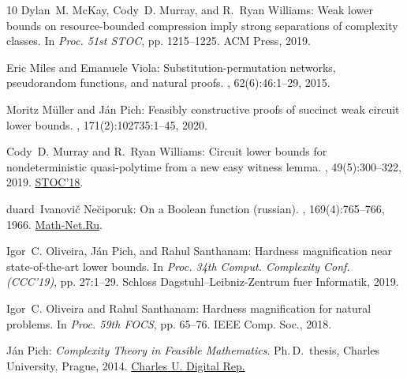 \documentclass[11pt]{article}
\numberwithin{equation}{section}
\theoremstyle{definition}
\theoremstyle{plain}
\begin{document}
\begin{thebibliography}{10}
{\sc Dylan~M. McKay, Cody~D. Murray, and R.~Ryan Williams}: Weak lower bounds
  on resource-bounded compression imply strong separations of complexity
  classes.
\newblock In {\em Proc. 51st STOC}, pp. 1215--1225. ACM Press, 2019.
\newblock [\epfmtdoi{10.1145/3313276.3316396}]

{\sc Eric Miles and Emanuele Viola}: Substitution-permutation networks,
  pseudorandom functions, and natural proofs.
, 62(6):46:1--29, 2015.
\newblock [\epfmtdoi{10.1145/2792978}]

{\sc Moritz M{\"{u}}ller and J{\'{a}}n Pich}: Feasibly constructive proofs of
  succinct weak circuit lower bounds.
, 171(2):102735:1--45, 2020.

{\sc Cody~D. Murray and R.~Ryan Williams}: Circuit lower bounds for
  nondeterministic quasi-polytime from a new easy witness lemma.
, 49(5):300--322, 2019.
\newblock \prelim \href{https://doi.org/10.1145/3188745.3188910}{STOC'18}.
\newblock [\epfmtdoi{10.1137/18M1195887}]

{duard~Ivanovi{\v c} Ne{\u{c}}iporuk}: On a {B}oolean function
  (russian).
, 169(4):765--766, 1966.
\newblock \href{http://mi.mathnet.ru/dan32449}{Math-Net.Ru}.

{\sc Igor~C. Oliveira, J\'an Pich, and Rahul Santhanam}: Hardness magnification
  near state-of-the-art lower bounds.
\newblock In {\em Proc. 34th Comput. Complexity Conf. (CCC'19)}, pp. 27:1--29.
  Schloss Dagstuhl--Leibniz-Zentrum fuer Informatik, 2019.

{\sc Igor~C. Oliveira and Rahul Santhanam}: Hardness magnification for natural
  problems.
\newblock In {\em Proc. 59th FOCS}, pp. 65--76. IEEE Comp. Soc., 2018.

{\sc J\'an Pich}: {\em Complexity Theory in Feasible Mathematics}.
\newblock Ph.\,D.\ thesis, Charles University, Prague, 2014.
\newblock \href{https://dspace.cuni.cz/handle/20.500.11956/69296}{Charles U.
  Digital Rep.}


\end{thebibliography}
\end{document}
